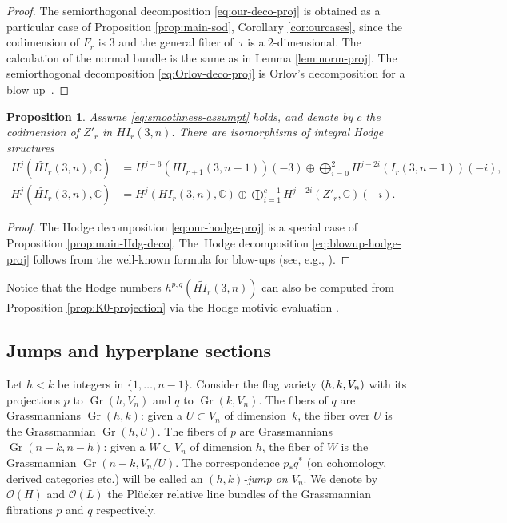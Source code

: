 \documentclass[11pt]{article}
\newcommand{\NoChangel}[1]{%
\expandafter\let\csname old\string#1\endcsname=#1
\let#1=\relax
\newcommand{#1}{\mathcode`l="716C\csname old\string#1\endcsname\mathcode`l="7160 }%
}
\let\mathcal\mathscr
\theoremstyle{plain}
\newtheorem{prop}[theorem]{Proposition}
\theoremstyle{definition}
\newcommand{\linedef}[1]{\emph{#1}}
\DeclareMathOperator{\Gr}{Gr}
\DeclareMathOperator{\Fl}{Fl}\NoChangel{\Fl}
\newcommand{\CC}{\mathbb{C}}
\newcommand{\sheaf}[1]{\mathcal{#1}}
\newcommand{\ko}{\sheaf{O}}\let\OO\ko\let\cO\ko
\begin{document}
\begin{proof}
The semiorthogonal decomposition \eqref{eq:our-deco-proj} is obtained as a particular case of Proposition \ref{prop:main-sod}, Corollary \ref{cor:ourcases}, since the codimension of $F_r$ is $3$ and the general fiber of~$\tau$ is a $2$-dimensional. The calculation of the normal bundle is the same as in Lemma \ref{lem:norm-proj}. The semiorthogonal decomposition \eqref{eq:Orlov-deco-proj} is Orlov's decomposition
for a blow-up~\cite{orlovprojbund}.
\end{proof}

\begin{prop}\label{prop:Hodge-projection}
Assume \eqref{eq:smoothness-assumpt} holds, and denote by $c$ the codimension of $Z'_r$ in $HI_r(3,n)$. There are isomorphisms of integral Hodge structures
\begin{align}\label{eq:our-hodge-proj}
H^j(\widetilde{HI_r}(3,n),\CC) &= H^{j-6}(HI_{r+1}(3,n-1))(-3) \oplus \bigoplus_{i=0}^2 H^{j-2i}(I_r(3,n-1))(-i),
\\
\label{eq:blowup-hodge-proj}
H^j(\widetilde{HI_r}(3,n),\CC) &= H^j(HI_r(3,n),\CC) \oplus \bigoplus_{i=1}^{c-1} H^{j-2i}(Z'_r,\CC)(-i).
\end{align}
\end{prop}

\begin{proof}
The Hodge decomposition \eqref{eq:our-hodge-proj} is a special case of Proposition \ref{prop:main-Hdg-deco}. The~Hodge decomposition \eqref{eq:blowup-hodge-proj} follows
from the well-known formula for blow-ups (see, e.g., \hbox{\cite[7.7.3]{voisin-book}}).
\end{proof}

Notice that the Hodge numbers $h^{p,q}(\widetilde{HI_r}(3,n))$ can also be computed from
Proposition \ref{prop:K0-projection} via the Hodge motivic evaluation \cite[\S 3.2]{craw}.

\subsection{Jumps and hyperplane sections}

Let $h<k$ be integers in $\{1,\ldots,n-1\}$.
Consider the flag variety $\Fl(h,k,V_n)$ with its projections $p$ to $\Gr(h,V_n)$ and $q$
to $\Gr(k,V_n)$. The fibers of $q$ are Grassmannians $\Gr(h,k)$: given a $U \subset V_n$ of dimension~$k$, the fiber over $U$ is the Grassmannian $\Gr(h,U)$. The fibers of
$p$ are Grassmannians $\Gr(n-k,n-h)$: given a $W \subset V_n$ of dimension $h$, the fiber of $W$ is the Grassmannian $\Gr(n-k,V_n/U)$. The correspondence $p_*q^*$ (on cohomology, derived categories etc.)
will be called an \linedef{$(h,k)$-jump on $V_n$}. We denote by $\ko(H)$ and $\ko(L)$ the Plücker
relative line bundles of the Grassmannian fibrations $p$ and $q$ respectively.
\end{document}
